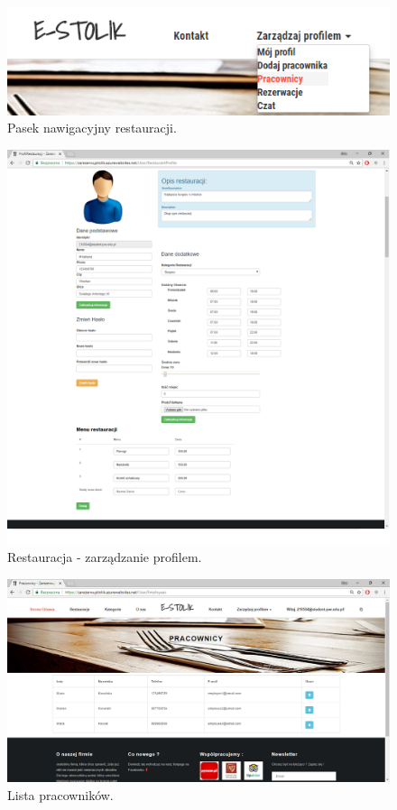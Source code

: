 \documentclass{article}
\begin{document}
\begin{figure}[H]
\centering
	\includegraphics[width=1.00\textwidth]{screens/menuRestaurant.png}
	\caption{Pasek nawigacyjny restauracji.}
\end{figure}


\begin{figure}[H]
\centering
	\includegraphics[width=1.00\textwidth]{screens/restaurantEdit.png}
	\caption{Restauracja - zarządzanie profilem.}
\end{figure}

\begin{figure}[H]
\centering
	\includegraphics[width=1.00\textwidth]{screens/employees.png}
	\caption{Lista pracowników.}
\end{figure}
\end{document}
